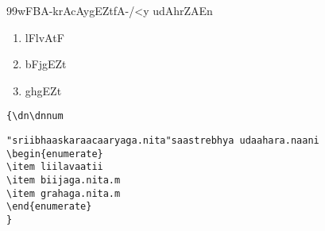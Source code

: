 \documentclass[12pt]{article}
\begin{document}
{\dn\dnnum
\399wF\-BA\--k\-rA\-cA\-y\0\-g\-EZ\-t\-fA\--/\?\-<y u\-dA\-h\-r\-ZA\-En
\begin{enumerate}
\item lF\-l\-vA\-tF
\item bF\-j\-g\-EZ\-t\2
\item g\5\-h\-g\-EZ\-t\2
\end{enumerate}
}

\verb+{\+{\tt dn}\verb+\+{\tt dnnum}
\begin{verbatim}
"sriibhaaskaraacaaryaga.nita"saastrebhya udaahara.naani
\begin{enumerate}
\item liilavaatii
\item biijaga.nita.m
\item grahaga.nita.m
\end{enumerate}
}
\end{verbatim}
\end{document}
